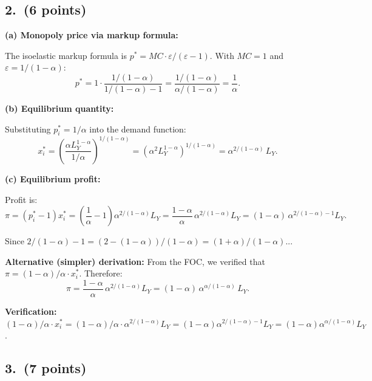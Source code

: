 \documentclass[a4paper,11pt]{article}
\begin{document}
\subsection*{2.\ (6 points)}

\begin{answerbox}
\textbf{(a) Monopoly price via markup formula:}

The isoelastic markup formula is $p^* = MC \cdot \varepsilon/(\varepsilon-1)$.  With $MC = 1$ and $\varepsilon = 1/(1-\alpha)$:
\[
    p^* = 1 \cdot \frac{1/(1-\alpha)}{1/(1-\alpha)-1}
    = \frac{1/(1-\alpha)}{\alpha/(1-\alpha)}
    = \boxed{\frac{1}{\alpha}.}
\]

\textbf{(b) Equilibrium quantity:}

Substituting $p_i^* = 1/\alpha$ into the demand function:
\[
    x_i^* = \left(\frac{\alpha L_Y^{1-\alpha}}{1/\alpha}\right)^{1/(1-\alpha)}
    = \left(\alpha^2 L_Y^{1-\alpha}\right)^{1/(1-\alpha)}
    = \boxed{\alpha^{2/(1-\alpha)}\,L_Y.}
\]

\textbf{(c) Equilibrium profit:}

Profit is:
\[
    \pi = (p_i^* - 1)x_i^*
    = \left(\frac{1}{\alpha} - 1\right)\alpha^{2/(1-\alpha)}L_Y
    = \frac{1-\alpha}{\alpha}\,\alpha^{2/(1-\alpha)}L_Y
    = (1-\alpha)\,\alpha^{2/(1-\alpha)-1}L_Y.
\]

Since $2/(1-\alpha) - 1 = (2-(1-\alpha))/(1-\alpha) = (1+\alpha)/(1-\alpha)$...

\textbf{Alternative (simpler) derivation:}  From the FOC, we verified that $\pi = (1-\alpha)/\alpha \cdot x_i^*$. Therefore:
\[
    \pi = \frac{1-\alpha}{\alpha}\,\alpha^{2/(1-\alpha)}L_Y = \boxed{(1-\alpha)\,\alpha^{\alpha/(1-\alpha)}\,L_Y.}
\]

\textbf{Verification:} $(1-\alpha)/\alpha \cdot x_i^* = (1-\alpha)/\alpha \cdot \alpha^{2/(1-\alpha)}L_Y = (1-\alpha)\alpha^{2/(1-\alpha)-1}L_Y = (1-\alpha)\alpha^{\alpha/(1-\alpha)}L_Y$. \checkmark
\end{answerbox}

\subsection*{3.\ (7 points)}
\end{document}
